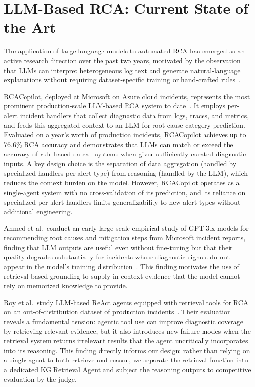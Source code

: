 \section{LLM-Based RCA: Current State of the Art}

The application of large language models to automated RCA has emerged as an active research
direction over the past two years, motivated by the observation that LLMs can interpret
heterogeneous log text and generate natural-language explanations without requiring
dataset-specific training or hand-crafted
rules~\cite{brown2020languagemodelsfewshotlearners,ouyang2022traininglanguagemodelsfollow}.

RCACopilot, deployed at Microsoft on Azure cloud incidents, represents the most prominent
production-scale LLM-based RCA system to date~\cite{chen2024rcacopilot}. It employs per-alert
incident handlers that collect diagnostic data from logs, traces, and metrics, and feeds this
aggregated context to an LLM for root cause category prediction. Evaluated on a year's worth of
production incidents, RCACopilot achieves up to 76.6\% RCA accuracy and demonstrates that LLMs
can match or exceed the accuracy of rule-based on-call systems when given sufficiently curated
diagnostic inputs. A key design choice is the separation of data aggregation (handled by
specialized handlers per alert type) from reasoning (handled by the LLM), which reduces the
context burden on the model. However, RCACopilot operates as a single-agent system with no
cross-validation of its prediction, and its reliance on specialized per-alert handlers limits
generalizability to new alert types without additional engineering.

Ahmed et al.\ conduct an early large-scale empirical study of GPT-3.x models for recommending
root causes and mitigation steps from Microsoft incident reports, finding that LLM outputs are
useful even without fine-tuning but that their quality degrades substantially for incidents whose
diagnostic signals do not appear in the model's training
distribution~\cite{ahmed2023rcarecommend}. This finding motivates the use of retrieval-based
grounding to supply in-context evidence that the model cannot rely on memorized knowledge to
provide.

Roy et al.\ study LLM-based ReAct agents equipped with retrieval tools for RCA on an
out-of-distribution dataset of production incidents~\cite{roy2024llmagentRCA}. Their evaluation
reveals a fundamental tension: agentic tool use can improve diagnostic coverage by retrieving
relevant evidence, but it also introduces new failure modes when the retrieval system returns
irrelevant results that the agent uncritically incorporates into its reasoning. This finding
directly informs our design: rather than relying on a single agent to both retrieve and reason,
we separate the retrieval function into a dedicated KG Retrieval Agent and subject the reasoning
outputs to competitive evaluation by the judge.

